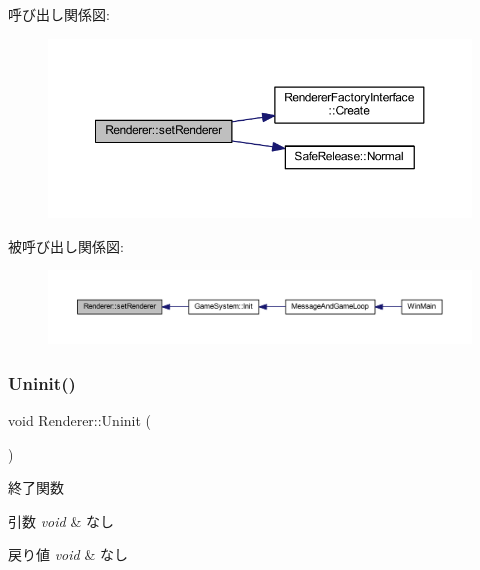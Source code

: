 呼び出し関係図\+:
\nopagebreak
\begin{figure}[H]
\begin{center}
\leavevmode
\includegraphics[width=350pt]{class_renderer_a02e3c483b2c9d8024e51639a06159066_cgraph}
\end{center}
\end{figure}
被呼び出し関係図\+:
\nopagebreak
\begin{figure}[H]
\begin{center}
\leavevmode
\includegraphics[width=350pt]{class_renderer_a02e3c483b2c9d8024e51639a06159066_icgraph}
\end{center}
\end{figure}
\mbox{\label{class_renderer_ae865246d6a04d467ac22458f6f5f69d4}} 
\subsubsection{\texorpdfstring{Uninit()}{Uninit()}}
{\footnotesize\ttfamily void Renderer\+::\+Uninit (\begin{DoxyParamCaption}{ }\end{DoxyParamCaption})}



終了関数 


\begin{DoxyParams}{引数}
{\em void} & なし \\
\hline
\end{DoxyParams}

\begin{DoxyRetVals}{戻り値}
{\em void} & なし \\
\hline
\end{DoxyRetVals}


